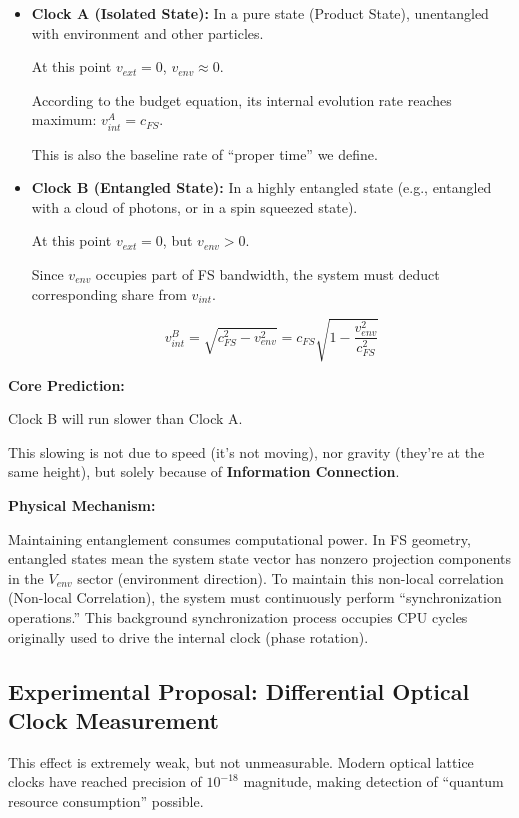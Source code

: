 \begin{itemize}
\item \textbf{Clock A (Isolated State):} In a pure state (Product State), unentangled with environment and other particles.

  At this point \textbf{$v_{ext} = 0$}, \textbf{$v_{env} \approx 0$}.

  According to the budget equation, its internal evolution rate reaches maximum: \textbf{$v_{int}^A = c_{FS}$}.

  This is also the baseline rate of ``proper time'' we define.

\item \textbf{Clock B (Entangled State):} In a highly entangled state (e.g., entangled with a cloud of photons, or in a spin squeezed state).

  At this point \textbf{$v_{ext} = 0$}, but \textbf{$v_{env} > 0$}.

  Since \textbf{$v_{env}$} occupies part of FS bandwidth, the system must deduct corresponding share from \textbf{$v_{int}$}.

  $$v_{int}^B = \sqrt{c_{FS}^2 - v_{env}^2} = c_{FS} \sqrt{1 - \frac{v_{env}^2}{c_{FS}^2}}$$
\end{itemize}

\textbf{Core Prediction:}

Clock B will run slower than Clock A.

This slowing is not due to speed (it's not moving), nor gravity (they're at the same height), but solely because of \textbf{Information Connection}.

\textbf{Physical Mechanism:}

Maintaining entanglement consumes computational power. In FS geometry, entangled states mean the system state vector has nonzero projection components in the \textbf{$V_{env}$} sector (environment direction). To maintain this non-local correlation (Non-local Correlation), the system must continuously perform ``synchronization operations.'' This background synchronization process occupies CPU cycles originally used to drive the internal clock (phase rotation).

\subsection{Experimental Proposal: Differential Optical Clock Measurement}

This effect is extremely weak, but not unmeasurable. Modern optical lattice clocks have reached precision of \textbf{$10^{-18}$} magnitude, making detection of ``quantum resource consumption'' possible.

